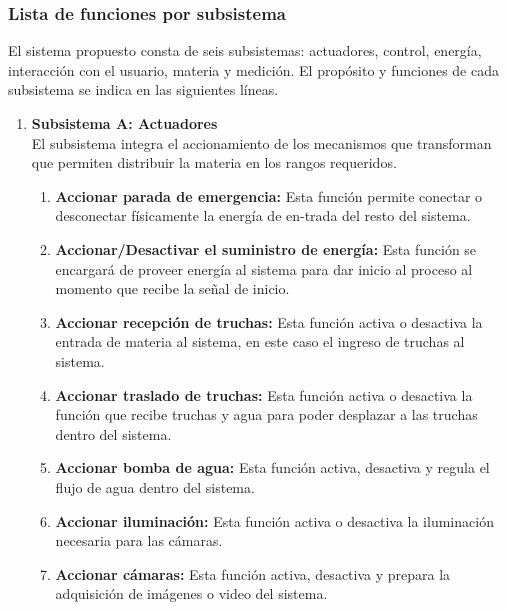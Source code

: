 \newpage
\thispagestyle{fancy}
\subsubsection{Lista de funciones por subsistema}

El sistema propuesto consta de seis subsistemas: actuadores, control, energía, interacción con el usuario, materia y medición. El propósito y funciones de cada subsistema se indica en las siguientes líneas.

\begin{enumerate}
	
	\item \textbf{Subsistema A: Actuadores}\\ El subsistema integra el accionamiento de los mecanismos que transforman que permiten distribuir la materia en los rangos requeridos.
		
		\begin{enumerate}[label=\Alph*)] %
			\item	\textbf{Accionar parada de emergencia:} Esta función permite conectar o desconectar físicamente la energía de en-trada del resto del sistema.
			
			\item	\textbf{Accionar/Desactivar el suministro de energía:} Esta función se encargará de proveer energía al sistema para dar inicio al proceso al momento que recibe la señal de inicio.
			
			\item	\textbf{Accionar recepción de truchas:} Esta función activa o desactiva la entrada de materia al sistema, en este caso el ingreso de truchas al sistema.
			
			\item	\textbf{Accionar traslado de truchas:} Esta función activa o desactiva la función que recibe truchas y agua para poder desplazar a las truchas dentro del sistema.
			
			\item	\textbf{Accionar bomba de agua:} Esta función activa, desactiva y regula el flujo de agua dentro del sistema. 
			
			\item	\textbf{Accionar iluminación:} Esta función activa o desactiva la iluminación necesaria para las cámaras.			

			\item	\textbf{Accionar cámaras:} Esta función activa, desactiva y prepara la adquisición de imágenes o video del sistema.
			

\end{enumerate}
\end{enumerate}
